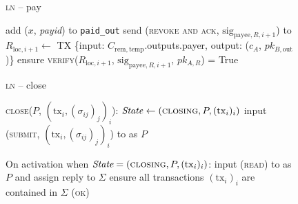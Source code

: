 \begin{figure}[H]
\begin{processbox}{\textsc{ln} -- pay}
\begin{algorithmic}[1]
        \State add ($x$, \textit{payid}) to \texttt{paid\_out}
        \State send (\textsc{revoke and ack}, $\mathrm{sig}_{\mathrm{payee}, R,
        i+1}$) to \bob
        \State $R_{\mathrm{loc}, i+1} \gets$ TX \{input: $C_{\mathrm{rem},
        \mathrm{temp}}$.outputs.payer, output: ($c_A$, $pk_{B,
        \mathrm{out}}$)\}
        \State ensure \textsc{verify}($R_{\mathrm{loc}, i+1}$,
        $\mathrm{sig}_{\mathrm{payee}, R, i+1}$, $pk_{A, R}$) = True
        \State {}
      \EndIndent
    \end{algorithmic}
  \end{processbox}
  \caption{}
  \label{code:ln:pay}
\end{figure}

\begin{figure}[H]
  \begin{processbox}{\textsc{ln} -- close}
    \begin{algorithmic}[1]
      \State \textsc{close}($P$, $(\mathrm{tx}_i, (\sigma_{ij})_j)_i$):
      \Indent
        \State {}
        \State $\mathit{State} \gets (\textsc{closing}, P, (\mathrm{tx}_i)_i)$
        \State input (\textsc{submit}, $(\mathrm{tx}_i, (\sigma_{ij})_j)_i$)
        to \ledger as $P$
      \EndIndent
      \Statex

      \State On activation when $\textit{State} = (\textsc{closing}, P,
      (\mathrm{tx}_i)_i)$:
      \Indent
        \State input (\textsc{read}) to \ledger as $P$ and assign reply to
        $\Sigma$
        \State ensure all transactions $(\mathrm{tx}_i)_i$ are contained in
        $\Sigma$
        \State \Return (\textsc{ok})
      \EndIndent
    \end{algorithmic}
  \end{processbox}
  \caption{}
  \label{code:ln:virtual}
\end{figure}
